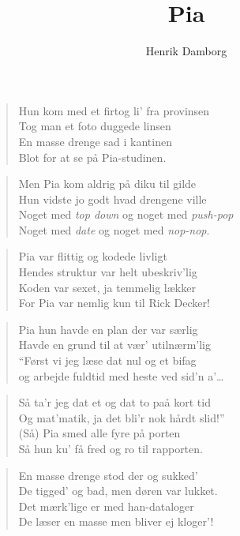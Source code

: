 \documentclass[a4paper,11pt]{article}
\title{{\sc Pia}}
\author{Henrik Damborg}
\begin{document}
\maketitle


\begin{sketch}

\begin{verse}
Hun kom med et firtog li' fra provinsen\\
Tog man et foto duggede linsen\\
En masse drenge sad i kantinen\\
Blot for at se på {\sc Pia}-studinen.\\
\end{verse}

\begin{verse}
Men {\sc Pia} kom aldrig på {\sc diku} til gilde\\
Hun vidste jo godt hvad drengene ville\\
Noget med {\em top down}\/ og noget med {\em push-pop}\\
Noget med {\em date}\/ og noget med {\em nop-nop}.\\
\end{verse}

\begin{verse}
{\sc Pia} var flittig og kodede livligt\\
Hendes struktur var helt ubeskriv'lig\\
Koden var sexet, ja temmelig lækker\\
For {\sc Pia} var nemlig kun til Rick Decker!\\
\end{verse}

\begin{verse}
{\sc Pia} hun havde en plan der var særlig\\
Havde en grund til at vær' utilnærm'lig\\
``Først vi jeg læse {\sc dat nul} og et bifag\\
og arbejde fuldtid med heste ved sid'n a'\dots\\
\end{verse}

\begin{verse}
Så ta'r jeg {\sc dat et} og {\sc dat to} paå kort tid\\
Og mat'matik, ja det bli'r nok hårdt slid!''\\
(Så) {\sc Pia} smed alle fyre på {\sc porten}\\
Så hun ku' få fred og ro til rapporten.\\
\end{verse}

\begin{verse}
En masse drenge stod der og sukked'\\
De tigged' og bad, men døren var lukket.\\
Det mærk'lige er med han-dataloger\\
De læser en masse men bliver ej kloger'!\\
\end{verse}
\end{sketch}
\end{document}
